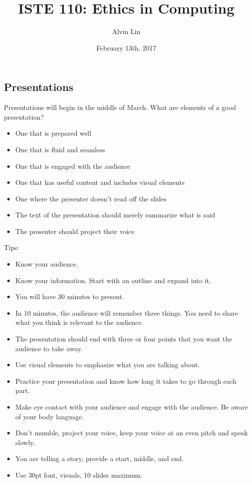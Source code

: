 \documentclass{article}
\title{ISTE 110: Ethics in Computing}
\author{Alvin Lin}
\date{February 13th, 2017}
\begin{document}
\maketitle

\subsection*{Presentations}
Presentations will begin in the middle of March.
What are elements of a good presentation?
\begin{itemize}
  \item One that is prepared well
  \item One that is fluid and seamless
  \item One that is engaged with the audience
  \item One that has useful content and includes visual elements
  \item One where the presenter doesn't read off the slides
  \item The text of the presentation should merely summarize what is said
  \item The presenter should project their voice
\end{itemize}
Tips:
\begin{itemize}
  \item Know your audience.
  \item Know your information. Start with an outline and expand into it.
  \item You will have 30 minutes to present.
  \item In 10 minutes, the audience will remember three things. You need to
    share what you think is relevant to the audience.
  \item The presentation should end with three or four points that you want
    the audience to take away.
  \item Use visual elements to emphasize what you are talking about.
  \item Practice your presentation and know how long it takes to go through
    each part.
  \item Make eye contact with your audience and engage with the audience. Be
    aware of your body language.
  \item Don't mumble, project your voice, keep your voice at an even pitch and
    speak slowly.
  \item You are telling a story, provide a start, middle, and end.
  \item Use 30pt font, visuals, 10 slides maximum.
\end{itemize}
\end{document}
